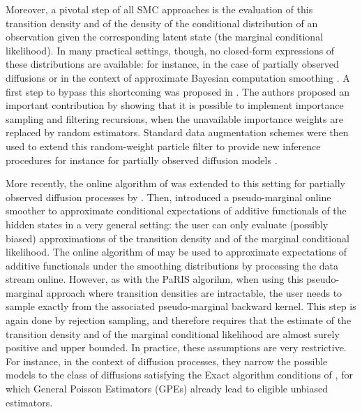 \documentclass[12pt]{article}
\begin{document}
Moreover, a pivotal step of all SMC approaches is the evaluation of this transition density and of the density of the conditional distribution of an observation given the corresponding latent state (the marginal conditional likelihood).
In many practical settings, though, no closed-form expressions of these distributions are available: for instance, in the case of partially observed diffusions \citep{andersson2017unbiased,fearnhead2017continuous} or in the context of  approximate Bayesian computation smoothing \citep{martin:jasra:singh:whiteley:delmoral:maccoy:2014}.
 A first step to bypass this shortcoming was proposed in  \cite{fearnhead2010random}. %
The authors proposed an important contribution by showing that it is possible to implement importance sampling and filtering recursions, when the unavailable importance weights are replaced by random estimators.
Standard data augmentation schemes were then used to extend this random-weight particle filter to provide new inference procedures for instance for partially observed diffusion models \citep{yonekura:beskos:2020}. 

More recently, the online algorithm of \cite{olsson2017efficient} was extended to this setting for partially observed diffusion processes by \cite{gloaguen2018online}.  Then, \cite{gloaguen2021pseudo} introduced a pseudo-marginal online smoother to approximate conditional expectations of additive functionals of the hidden states in a very general setting: the user can only evaluate (possibly biased) approximations of the transition density and of the marginal conditional likelihood. 
The online algorithm of \cite{gloaguen2021pseudo} may be used to approximate expectations of additive functionals under the smoothing distributions by processing the data stream online.
However, as with the PaRIS algorihm, when using this pseudo-marginal approach where transition densities are intractable, the user needs to sample exactly from the associated pseudo-marginal backward kernel. 
This step is again done by rejection sampling, and therefore requires that the estimate of the transition density and of the marginal conditional  likelihood  are almost surely positive and upper bounded.  
In practice, these assumptions are very restrictive. %
For instance, in the context of diffusion processes, they narrow the possible models to the class of diffusions satisfying the Exact algorithm conditions of \cite{beskos2006retrospective}, for which  General Poisson Estimators (GPEs) \citep{fearnhead2008particle} already lead to eligible unbiased estimators.  
\end{document}
